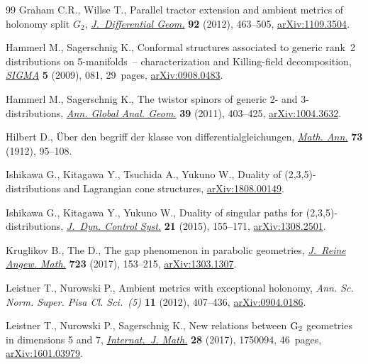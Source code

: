 \documentclass[10pt,a4paper]{amsart}
\numberwithin{equation}{section}
\begin{document}
\begin{thebibliography}{99}
Graham C.R., Willse T., Parallel tractor extension and ambient metrics of
 holonomy split {$G_2$}, \href{https://doi.org/10.4310/jdg/1354110197}{\textit{J.~Differential Geom.}} \textbf{92} (2012),
 463--505, \href{https://arxiv.org/abs/1109.3504}{arXiv:1109.3504}.

Hammerl M., Sagerschnig K., Conformal structures associated to generic rank~2
 distributions on 5-manifolds~-- characterization and {K}illing-field
 decomposition, \href{https://doi.org/10.3842/SIGMA.2009.081}{\textit{SIGMA}} \textbf{5} (2009), 081, 29~pages,
 \href{https://arxiv.org/abs/0908.0483}{arXiv:0908.0483}.

Hammerl M., Sagerschnig K., The twistor spinors of generic 2- and
 3-distributions, \href{https://doi.org/10.1007/s10455-010-9240-2}{\textit{Ann. Global Anal. Geom.}} \textbf{39} (2011),
 403--425, \href{https://arxiv.org/abs/1004.3632}{arXiv:1004.3632}.

Hilbert D., \"{U}ber den begriff der klasse von differentialgleichungen,
 \href{https://doi.org/10.1007/BF01456663}{\textit{Math. Ann.}} \textbf{73} (1912), 95--108.

Ishikawa G., Kitagawa Y., Tsuchida A., Yukuno W., Duality of
 (2,3,5)-distributions and {L}agrangian cone structures, \href{https://arxiv.org/abs/1808.00149}{arXiv:1808.00149}.

Ishikawa G., Kitagawa Y., Yukuno W., Duality of singular paths for
 (2,3,5)-distributions, \href{https://doi.org/10.1007/s10883-014-9216-9}{\textit{J.~Dyn. Control Syst.}} \textbf{21} (2015),
 155--171, \href{https://arxiv.org/abs/1308.2501}{arXiv:1308.2501}.

Kruglikov B., The D., The gap phenomenon in parabolic geometries,
 \href{https://doi.org/10.1515/crelle-2014-0072}{\textit{J.~Reine Angew. Math.}} \textbf{723} (2017), 153--215,
 \href{https://arxiv.org/abs/1303.1307}{arXiv:1303.1307}.

Leistner T., Nurowski P., Ambient metrics with exceptional holonomy,
 \textit{Ann. Sc. Norm. Super. Pisa Cl. Sci.~(5)} \textbf{11} (2012),
 407--436, \href{https://arxiv.org/abs/0904.0186}{arXiv:0904.0186}.

Leistner T., Nurowski P., Sagerschnig K., New relations between {${\rm G}_2$}
 geometries in dimensions 5 and 7, \href{https://doi.org/10.1142/S0129167X1750094X}{\textit{Internat.~J. Math.}} \textbf{28}
 (2017), 1750094, 46~pages, \href{https://arxiv.org/abs/1601.03979}{arXiv:1601.03979}.


\end{thebibliography}
\end{document}
